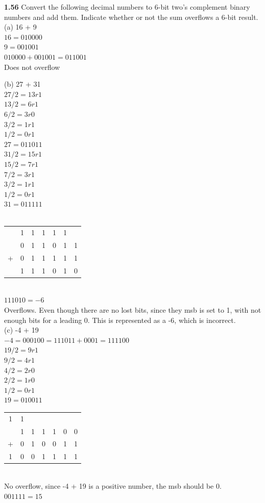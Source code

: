 \documentclass[12pt,a4paper]{report}
\begin{document}
\begin{normalsize}
\textbf{1.56} Convert the following decimal numbers to 6-bit two's complement binary numbers and add them. Indicate whether or not the sum overflows a 6-bit result. \\
(a) 16 + 9 \\
$ 16 = 010000 $ \\
$ 9 = 001001 $ \\
$ 010000 + 001001 = 011001 $ \\
Does not overflow

(b) 27 + 31 \\
$ 27/2 = 13r1 $ \\
$ 13/2 = 6r1 $ \\
$ 6/2 = 3r0 $ \\
$ 3/2 = 1r1 $ \\
$ 1/2 = 0r1 $ \\
$ 27 = 011011 $ \\
$ 31/2 = 15r1 $ \\
$ 15/2 = 7r1 $ \\
$ 7/2 = 3r1 $ \\
$ 3/2 = 1r1 $ \\
$ 1/2 = 0r1 $ \\
$ 31 = 011111 $ \\ \\
\begin{tabular}{c@{\,}c@{\,}c@{\,}c@{\,}c@{\,}c@{\,}c}
  & 1 & 1 & 1 & 1 & 1 & \\
  & 0 & 1 & 1 & 0 & 1 & 1 \\
+ & 0 & 1 & 1 & 1 & 1 & 1 \\
\hline
  & 1 & 1 & 1 & 0 & 1 & 0 \\
\end{tabular} \\
$ 111010 = -6 $ \\
Overflows. Even though there are no lost bits, since they msb is set to 1, with not enough bits for a leading 0. This is represented as a -6, which is incorrect. \\

(c) -4 + 19 \\
$ -4 = 000100 = 111011 + 0001 = 111100 $ \\
$ 19/2 = 9r1 $ \\
$ 9/2 = 4r1 $ \\
$ 4/2 = 2r0 $ \\
$ 2/2 = 1r0 $ \\
$ 1/2 = 0r1$ \\
$ 19 = 010011 $ \\ 
\begin{tabular}{c@{\,}c@{\,}c@{\,}c@{\,}c@{\,}c@{\,}c}
1 & 1 &   &   &   &   & \\
  & 1 & 1 & 1 & 1 & 0 & 0 \\
+ & 0 & 1 & 0 & 0 & 1 & 1 \\
\hline
1 & 0 & 0 & 1 & 1 & 1 & 1 \\
\end{tabular} \\
No overflow, since -4 + 19 is a positive number, the msb should be 0. \\
$ 001111 = 15 $ \\


\end{normalsize}
\end{document}
